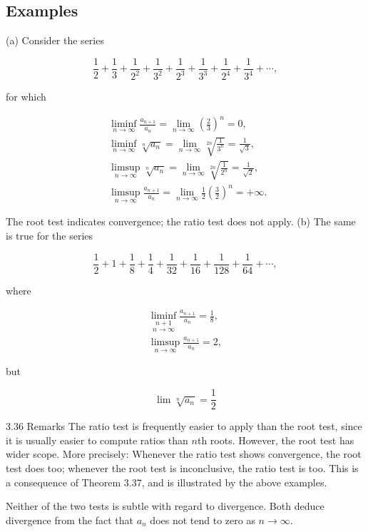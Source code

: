 \documentclass[10pt]{article}
\begin{document}
\subsection{Examples}
(a) Consider the series

$$
\frac{1}{2}+\frac{1}{3}+\frac{1}{2^{2}}+\frac{1}{3^{2}}+\frac{1}{2^{3}}+\frac{1}{3^{3}}+\frac{1}{2^{4}}+\frac{1}{3^{4}}+\cdots,
$$

for which

$$
\begin{aligned}
& \liminf _{n \rightarrow \infty} \frac{a_{n+1}}{a_{n}}=\lim _{n \rightarrow \infty}\left(\frac{2}{3}\right)^{n}=0 \text {, } \\
& \liminf _{n \rightarrow \infty} \sqrt[n]{a_{n}}=\lim _{n \rightarrow \infty} \sqrt[2 n]{\frac{1}{3^{n}}}=\frac{1}{\sqrt{3}}, \\
& \limsup _{n \rightarrow \infty} \sqrt[n]{a_{n}}=\lim _{n \rightarrow \infty} \sqrt[2 n]{\frac{1}{2^{n}}}=\frac{1}{\sqrt{2}}, \\
& \limsup _{n \rightarrow \infty} \frac{a_{n+1}}{a_{n}}=\lim _{n \rightarrow \infty} \frac{1}{2}\left(\frac{3}{2}\right)^{n}=+\infty \text {. }
\end{aligned}
$$

The root test indicates convergence; the ratio test does not apply. (b) The same is true for the series

$$
\frac{1}{2}+1+\frac{1}{8}+\frac{1}{4}+\frac{1}{32}+\frac{1}{16}+\frac{1}{128}+\frac{1}{64}+\cdots,
$$

where

$$
\begin{gathered}
\underset{n \rightarrow \infty}{\liminf _{n+1}} \frac{a_{n+1}}{a_{n}}=\frac{1}{8}, \\
\limsup _{n \rightarrow \infty} \frac{a_{n+1}}{a_{n}}=2,
\end{gathered}
$$

but

$$
\lim \sqrt[n]{a_{n}}=\frac{1}{2}
$$

3.36 Remarks The ratio test is frequently easier to apply than the root test, since it is usually easier to compute ratios than $n$th roots. However, the root test has wider scope. More precisely: Whenever the ratio test shows convergence, the root test does too; whenever the root test is inconclusive, the ratio test is too. This is a consequence of Theorem 3.37, and is illustrated by the above examples.

Neither of the two tests is subtle with regard to divergence. Both deduce divergence from the fact that $a_{n}$ does not tend to zero as $n \rightarrow \infty$.
\end{document}
